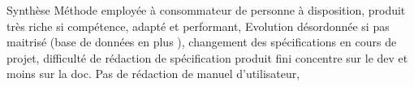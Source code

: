 Synthèse
Méthode employée à consommateur de personne à disposition, produit très riche si compétence,  adapté et performant, Evolution désordonnée si pas maitrisé (base de données en plus ), changement des spécifications  en cours de projet, difficulté de rédaction de spécification produit fini concentre sur le dev et moins sur la doc.
Pas de rédaction de manuel d’utilisateur,

